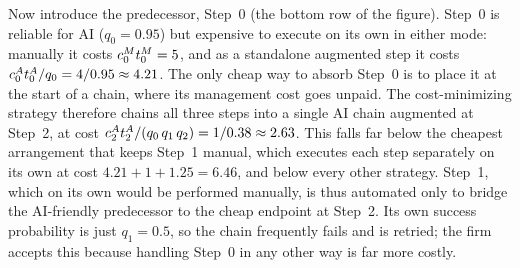 \documentclass[12pt, final]{article}
\begin{document}
\begin{example}
Now introduce the predecessor, Step~0 (the bottom row of the figure).
Step~0 is reliable for AI ($q_0 = 0.95$) but expensive to execute on its own in either mode: manually it costs $c^{M}_{0}t^{M}_{0} = 5$, and as a standalone augmented step it costs $c^{A}_{0}t^{A}_{0}/q_0 = 4/0.95 \approx 4.21$.
The only cheap way to absorb Step~0 is to place it at the start of a chain, where its management cost goes unpaid.
The cost-minimizing strategy therefore chains all three steps into a single AI chain augmented at Step~2, at cost $c^{A}_{2}t^{A}_{2}/(q_0\, q_1\, q_2) = 1/0.38 \approx 2.63$.
This falls far below the cheapest arrangement that keeps Step~1 manual, which executes each step separately on its own at cost $4.21 + 1 + 1.25 = 6.46$, and below every other strategy.
Step~1, which on its own would be performed manually, is thus automated only to bridge the AI-friendly predecessor to the cheap endpoint at Step~2.
Its own success probability is just $q_1 = 0.5$, so the chain frequently fails and is retried; the firm accepts this because handling Step~0 in any other way is far more costly.
\end{example}
\clearpage
\end{document}
